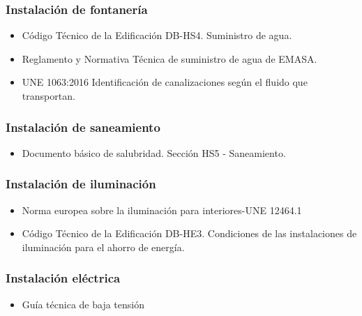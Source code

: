 \documentclass[../main.tex]{subfiles}
\begin{document}
\subsubsection{Instalación de fontanería}
\begin{itemize}
    \item Código Técnico de la Edificación DB-HS4. Suministro de agua.
    \item Reglamento y Normativa Técnica de suministro de agua de EMASA.
    \item UNE 1063:2016 Identificación de canalizaciones según el fluido que transportan.
\end{itemize}

\subsubsection{Instalación de saneamiento}
\begin{itemize}
    \item Documento básico de salubridad. Sección HS5 - Saneamiento.
\end{itemize}

\subsubsection{Instalación de iluminación}
\begin{itemize}
    \item Norma europea sobre la iluminación para interiores-UNE 12464.1 
    \item Código Técnico de la Edificación DB-HE3. Condiciones de las instalaciones de iluminación para el ahorro de energía.
\end{itemize}

\subsubsection{Instalación eléctrica}
\begin{itemize}
    \item Guía técnica de baja tensión
\end{itemize}
\end{document}
